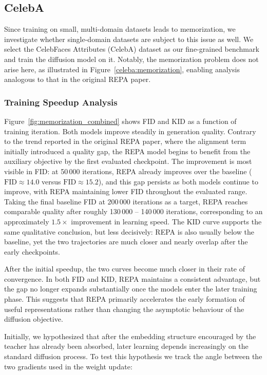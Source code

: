 \subsection{CelebA}
\label{sec:celeba}

Since training on small, multi-domain datasets leads to memorization, we investigate
whether single-domain datasets are subject to this issue as well. We select the
CelebFaces Attributes (CelebA) dataset as our fine-grained benchmark and train the
diffusion model on it. Notably, the memorization problem does not arise here, as
illustrated in Figure~\ref{celeba:memorization}, enabling analysis analogous to that
in the original REPA paper.

\subsubsection{Training Speedup Analysis}

Figure~\ref{fig:memorization_combined} shows FID and KID as a function of training
iteration. Both models improve steadily in generation quality. Contrary to the
trend reported in the original REPA paper, where the alignment term initially
introduced a quality gap, the REPA model begins to benefit from the auxiliary
objective by the first evaluated checkpoint. The improvement is most visible in
FID: at 50\,000 iterations, REPA already improves over the baseline
($\mathrm{FID}\approx 14.0$ versus $\mathrm{FID}\approx 15.2$), and this gap
persists as both models continue to improve, with REPA maintaining lower FID
throughout the evaluated range. Taking the final baseline FID at 200\,000
iterations as a target, REPA reaches comparable quality after roughly
130\,000 -- 140\,000 iterations, corresponding to an approximately $1.5{\times}$
improvement in learning speed. The KID curve supports the same qualitative
conclusion, but less decisively: REPA is also usually below the baseline, yet the
two trajectories are much closer and nearly overlap after the early checkpoints.

After the initial speedup, the two curves become much closer in their rate of
convergence. In both FID and KID, REPA maintains a consistent advantage, but the
gap no longer expands substantially once the models enter the later training
phase. This suggests that REPA primarily accelerates the early formation of useful
representations rather than changing the asymptotic behaviour of the diffusion
objective.

Initially, we hypothesized that after the embedding structure encouraged by the teacher has
already been absorbed, later learning depends increasingly on the standard
diffusion process. To test this hypothesis we track the angle between the two gradients used in
the weight update:

